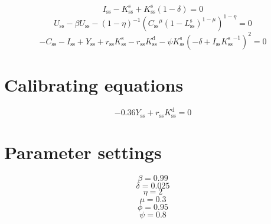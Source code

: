 \begin{equation}
I_\mathrm{ss} - K^{\mathrm{s}}_\mathrm{ss} + {K^{\mathrm{s}}_\mathrm{ss}} \left(1 - \delta\right) = 0
\end{equation}
\begin{equation}
U_\mathrm{ss} - {\beta} {U_\mathrm{ss}} - \left(1 - \eta\right)^{-1} {\left({{C_\mathrm{ss}}^{\mu}} {\left(1 - L^{\mathrm{s}}_\mathrm{ss}\right)^{1 - \mu}}\right)^{1 - \eta}} = 0
\end{equation}
\begin{equation}
-C_\mathrm{ss} - I_\mathrm{ss} + Y_\mathrm{ss} + {r_\mathrm{ss}} {K^{\mathrm{s}}_\mathrm{ss}} - {r_\mathrm{ss}} {K^{\mathrm{d}}_\mathrm{ss}} - {\psi} {K^{\mathrm{s}}_\mathrm{ss}} \left(-\delta + {I_\mathrm{ss}} {K^{\mathrm{s}}_\mathrm{ss}}^{-1}\right)^{2} = 0
\end{equation}



\section{Calibrating equations}

\begin{equation}
-0.36Y_\mathrm{ss} + {r_\mathrm{ss}} {K^{\mathrm{d}}_\mathrm{ss}} = 0
\end{equation}



\section{Parameter settings}

\begin{equation}
\beta = 0.99
\end{equation}
\begin{equation}
\delta = 0.025
\end{equation}
\begin{equation}
\eta = 2
\end{equation}
\begin{equation}
\mu = 0.3
\end{equation}
\begin{equation}
\phi = 0.95
\end{equation}
\begin{equation}
\psi = 0.8
\end{equation}


